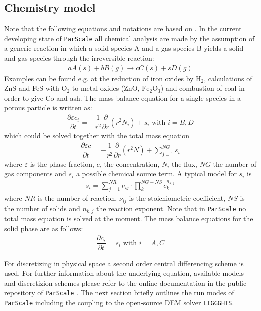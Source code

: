 \documentclass{particles2015}
\begin{document}
\subsection{Chemistry model}
Note that the following equations and notations are based on \cite{Noorman2011}. In the current developing state of \texttt{ParScale} all chemical analysis are made by the assumption of a generic reaction in which a solid species A and a gas species B yields a solid and gas species through the irreversible reaction:
\begin{align}
a A (s) + bB (g) \rightarrow cC(s) + sD(g)
\end{align}
Examples can be found e.g. at the reduction of iron oxides by $\text{H}_2$, calculations of ZnS and FeS with $\text{O}_2$ to metal oxides (ZnO, $\text{Fe}_2\text{O}_3$) and combustion of coal in order to give Co and ash. The mass balance equation for a single species in a porous particle is written as:
\begin{align}
\dfrac{\partial \varepsilon c_i}{\partial t} = - \dfrac{1}{r^2} \dfrac{\partial}{\partial r } (r^2 N_i) + s_i \text{ with } i = B, D
\end{align}
which could be solved together with the total mass equation
\begin{align}
\dfrac{\partial \varepsilon c}{\partial t} = - \dfrac{1}{r^2} \dfrac{\partial}{\partial r } (r^2 N) + \sum\limits_{j=1}^{NG} s_i
\label{eqn:total_concentration}
\end{align}
where $\varepsilon$ is the phase fraction, $c_i$ the concentration, $N_i$ the flux, $NG$ the number of gas components and $s_i$ a possible chemical source term. A typical model for $s_i$ is
\begin{align}
s_i = \sum\limits_{j=1}^{NR} \nu_{ij} \cdot \prod\limits_k^{NG+NS} c_k^{n_{k,j}}
\end{align} 
where $NR$ is the number of reaction, $\nu_{ij}$ is the stoichiometric coefficient, $NS$ is the number of solids and $n_{k,j}$ the reaction exponent. Note that in \texttt{ParScale} no total mass equation is solved at the moment. The mass balance equations for the solid phase are as follows:
\begin{align}
\dfrac{\partial c_i}{\partial t} = s_i \text{ with } i = A, C
\end{align}


For discretizing in physical space a second order central differencing scheme is used. For further information about the underlying equation, available models and discretizion schemes please refer to the online documentation in the public repository of \texttt{ParScale} \cite{ParScale_Public}. The next section briefly outlines the run modes of \texttt{ParScale} including the coupling to the open-source DEM solver \texttt{LIGGGHTS}\textsuperscript{\textregistered}.
\end{document}
